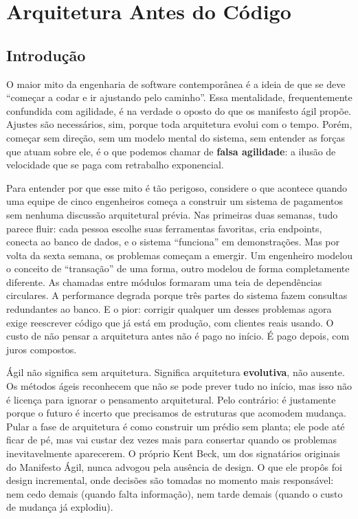 \chapter{Arquitetura Antes do Código}

\section{Introdução}

O maior mito da engenharia de software contemporânea é a ideia de que se deve
``começar a codar e ir ajustando pelo caminho''. Essa mentalidade, frequentemente
confundida com agilidade, é na verdade o oposto do que os manifesto ágil propõe.
Ajustes são necessários, sim, porque toda arquitetura evolui com o tempo. Porém,
começar sem direção, sem um modelo mental do sistema, sem entender as forças que
atuam sobre ele, é o que podemos chamar de \textbf{falsa agilidade}: a ilusão
de velocidade que se paga com retrabalho exponencial.

Para entender por que esse mito é tão perigoso, considere o que acontece quando
uma equipe de cinco engenheiros começa a construir um sistema de pagamentos sem
nenhuma discussão arquitetural prévia. Nas primeiras duas semanas, tudo parece
fluir: cada pessoa escolhe suas ferramentas favoritas, cria endpoints, conecta
ao banco de dados, e o sistema ``funciona'' em demonstrações. Mas por
volta da sexta semana, os problemas começam a emergir. Um engenheiro modelou o
conceito de ``transação'' de uma forma, outro modelou de forma completamente
diferente. As chamadas entre módulos formaram uma teia de dependências circulares.
A performance degrada porque três partes do sistema fazem consultas redundantes
ao banco. E o pior: corrigir qualquer um desses problemas agora exige reescrever
código que já está em produção, com clientes reais usando. O custo de não pensar
a arquitetura antes não é pago no início. É pago depois, com juros compostos.

Ágil não significa sem arquitetura. Significa arquitetura \textbf{evolutiva},
não ausente. Os métodos ágeis reconhecem que não se pode prever tudo no início,
mas isso não é licença para ignorar o pensamento arquitetural. Pelo contrário:
é justamente porque o futuro é incerto que precisamos de estruturas que acomodem
mudança. Pular a fase de arquitetura é como construir um prédio sem planta;
ele pode até ficar de pé, mas vai custar dez vezes mais para consertar quando
os problemas inevitavelmente aparecerem. O próprio Kent Beck, um dos signatários
originais do Manifesto Ágil, nunca advogou pela ausência de design. O que ele
propôs foi design incremental, onde decisões são tomadas no momento mais
responsável: nem cedo demais (quando falta informação), nem tarde demais
(quando o custo de mudança já explodiu).

